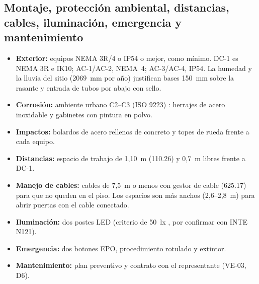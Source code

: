 \subsection{Montaje, protección ambiental, distancias, cables, iluminación, emergencia y mantenimiento}
\begin{itemize}
\item \textbf{Exterior:} equipos NEMA 3R/4 o IP54 o mejor, como mínimo. DC-1 es NEMA 3R e IK10; AC-1/AC-2, NEMA~4; AC-3/AC-4, IP54. La humedad y la lluvia del sitio (2069~mm por año) justifican bases 150~mm sobre la rasante y entrada de tubos por abajo con sello.
\item \textbf{Corrosión:} ambiente urbano C2--C3 (ISO 9223) \supuesto{}: herrajes de acero inoxidable y gabinetes con pintura en polvo.
\item \textbf{Impactos:} bolardos de acero rellenos de concreto y topes de rueda frente a cada equipo.
\item \textbf{Distancias:} espacio de trabajo de 1,10~m (110.26) y 0,7~m libres frente a DC-1.
\item \textbf{Manejo de cables:} cables de 7,5~m o menos con gestor de cable (625.17) para que no queden en el piso. Los espacios son más anchos (2,6--2,8~m) para abrir puertas con el cable conectado.
\item \textbf{Iluminación:} dos postes LED (criterio de 50~lx \supuesto{}, por confirmar con INTE N121).
\item \textbf{Emergencia:} dos botones EPO, procedimiento rotulado y extintor.
\item \textbf{Mantenimiento:} plan preventivo y contrato con el representante (VE-03, D6).
\end{itemize}

